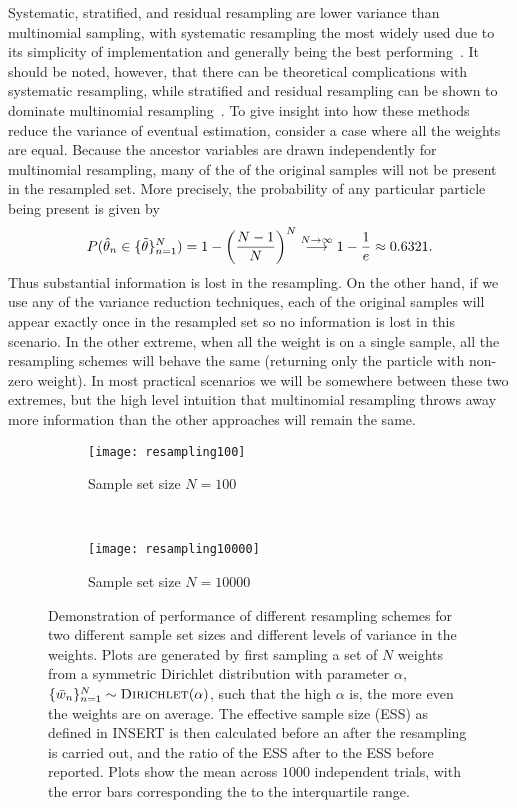 Systematic, stratified, and residual resampling are lower variance than multinomial sampling, 
with systematic resampling the most widely used due to its simplicity of implementation and
generally being the best performing~\cite{doucet2009tutorial}.  It should be noted, however, that
there can be theoretical complications with systematic resampling, while stratified and 
residual resampling can be shown to dominate multinomial resampling~\citep{douc2005comparison}.
To give insight into how these methods reduce the variance of eventual estimation, consider
a case where all the weights are equal.  Because the ancestor variables are drawn independently
for multinomial resampling, many of the of the original samples will not be present in the resampled
set.  More precisely, the probability of any particular particle being present is given by
\[
P(\hat{\theta}_n \in \{\tilde{\theta}\}_{n=1}^N) = 1-\left(\frac{N-1}{N}\right)^{N} 
\overset{N\to\infty}{\longrightarrow} 1-\frac{1}{e} \approx 0.6321.
\]
Thus substantial information is lost in the resampling.
On the other hand, if we use any of the variance reduction techniques, each of the original samples
will appear exactly once in the resampled set so no information is lost in this scenario.  In the
other extreme, when all the weight is on a single sample, all the resampling schemes will behave the
same (returning only the particle with non-zero weight).  In most practical scenarios we will be
somewhere between these two extremes, but the high level intuition that multinomial resampling
throws away more information than the other approaches will remain the same.

\begin{figure}[t]
	\centering
	\begin{subfigure}[t]{0.49\textwidth}
	\texttt{[image: resampling100]}
	\caption{Sample set size $N=100$}
	\end{subfigure}
	~
	\begin{subfigure}[t]{0.49\textwidth}
	\texttt{[image: resampling10000]}
	\caption{Sample set size $N=10000$}
	\end{subfigure}
	\caption{Demonstration of performance of different resampling schemes for
		two different sample set sizes and different levels of variance in the weights.
		Plots are generated by first sampling a set of $N$ weights from a symmetric
		Dirichlet distribution with parameter $\alpha$, 
		$\{\bar{w}_n\}_{n=1}^N \sim \textsc{Dirichlet}(\alpha)$, such that the
		high $\alpha$ is, the more even the weights are on average.  The effective
		sample size (ESS) as defined in INSERT is then calculated before an after the
		resampling is carried out, and the ratio of the ESS after to the ESS before
		reported.  Plots show the mean across $1000$ independent trials, with the
		error bars corresponding the to the interquartile range.
		\label{fig:inf:resample}}
\end{figure}

